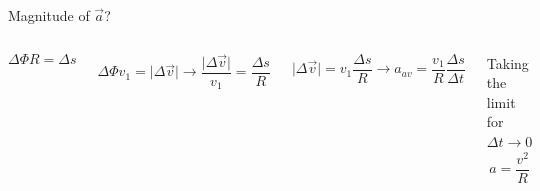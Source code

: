 \documentclass[]{beamer}
\begin{document}
\begin{frame}
\begin{columns}[c]
           
           
            
      
         \end{columns}
 
     
       \end{frame}









\begin{frame}

    Magnitude of $\vec{a}$?
   
    \begin{columns}[c]
         \column{2.3in}  %
   
        


         \begin{equation*}
            \Delta \Phi R =\Delta s 
           \end{equation*}
           
         
            \begin{equation*}
            \Delta \Phi v_1 =\vert \Delta  \vec{v} \vert \rightarrow \frac{\vert\Delta \vec{v}\vert}{v_1} =\frac{\Delta s}{R}
           \end{equation*}
  
         \begin{equation*}
          \vert\Delta \vec{v}\vert =v_1\frac{\Delta s}{R}\rightarrow a_{av}=\frac{v_1}{R}\frac{\Delta s}{\Delta t}
           \end{equation*}
           
           Taking the limit for ${\Delta t\to 0}$
            \begin{equation*}
          \boxed{a=\frac{v^2}{R}}
           \end{equation*} 
           
 
         \column{2.5in}
         

\end{columns}
\end{frame}
\end{document}
